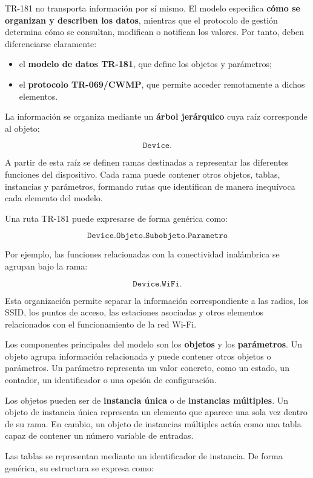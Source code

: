 TR-181 no transporta información por sí mismo. El modelo especifica
\textbf{cómo se organizan y describen los datos}, mientras que el
protocolo de gestión determina cómo se consultan, modifican o notifican
los valores. Por tanto, deben diferenciarse claramente:

\begin{itemize}
    \item el \textbf{modelo de datos TR-181}, que define los objetos y
    parámetros;

    \item el \textbf{protocolo TR-069/CWMP}, que permite acceder
    remotamente a dichos elementos.
\end{itemize}

La información se organiza mediante un
\textbf{árbol jerárquico} cuya raíz corresponde al objeto:

\[
    \texttt{Device.}
\]

A partir de esta raíz se definen ramas destinadas a representar las
diferentes funciones del dispositivo. Cada rama puede contener otros
objetos, tablas, instancias y parámetros, formando rutas que identifican
de manera inequívoca cada elemento del modelo.

Una ruta TR-181 puede expresarse de forma genérica como:

\[
    \texttt{Device.Objeto.Subobjeto.Parametro}
\]

Por ejemplo, las funciones relacionadas con la conectividad inalámbrica
se agrupan bajo la rama:

\[
    \texttt{Device.WiFi.}
\]

Esta organización permite separar la información correspondiente a las
radios, los SSID, los puntos de acceso, las estaciones asociadas y otros
elementos relacionados con el funcionamiento de la red Wi-Fi.

Los componentes principales del modelo son los
\textbf{objetos} y los \textbf{parámetros}. Un objeto agrupa información
relacionada y puede contener otros objetos o parámetros. Un parámetro
representa un valor concreto, como un estado, un contador, un
identificador o una opción de configuración.

Los objetos pueden ser de
\textbf{instancia única} o de \textbf{instancias múltiples}. Un objeto
de instancia única representa un elemento que aparece una sola vez
dentro de su rama. En cambio, un objeto de instancias múltiples actúa
como una tabla capaz de contener un número variable de entradas.

Las tablas se representan mediante un identificador de instancia. De
forma genérica, su estructura se expresa como:

